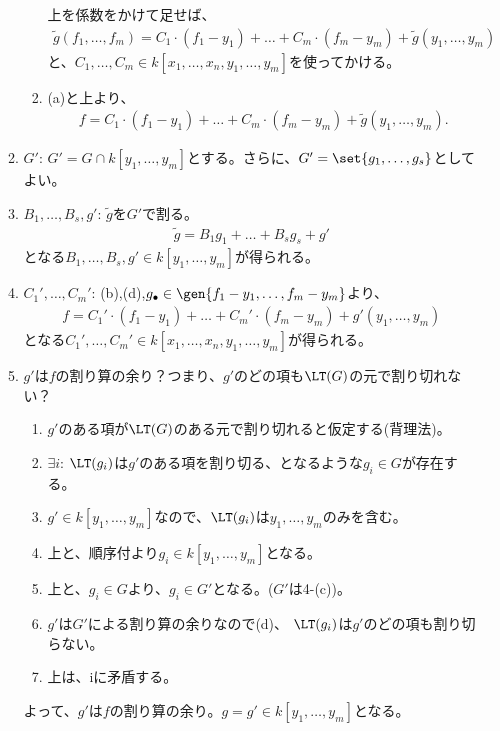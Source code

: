 \begin{myproof}
\begin{enumerate}
\begin{enumerate}
\begin{enumerate}
        上を係数をかけて足せば、
        \begin{align}
          \tilde g(f_1,\dots,f_m)
          =
          C_1 \cdot (f_1-y_1)  + \dots + C_m \cdot (f_m-y_m) + \tilde g(y_1,\dots,y_m)
        \end{align}
        と、$C_1,\dots,C_m \in k[x_1,\dots,x_n,y_1,\dots,y_m]$を使ってかける。
        \item
          (a)と上より、
          \begin{align}
            f
            =
            C_1 \cdot (f_1-y_1)  + \dots + C_m \cdot (f_m-y_m) + \tilde g(y_1,\dots,y_m).
          \end{align}
      \end{enumerate}
      \item
      $G'$: $G'= G\cap k[y_1,\dots,y_m]$とする。さらに、$G'=\set{g_1,\dots,g_s}$としてよい。
      \item
      $B_1,\dots,B_s,g'$:
      $\tilde g$を$G'$で割る。
      \begin{align}
        \tilde g= B_1 g_1 + \dots + B_s g_s + g'
      \end{align}
      となる$B_1,\dots,B_s , g' \in k[y_1,\dots,y_m]$が得られる。
      \item $C_1',\dots,C_m'$:
      (b),(d),$g_\bullet \in \gen{f_1-y_1,\dots,f_m-y_m}$より、
      \begin{align}
        f = C_1' \cdot (f_1-y_1) + \dots + C_m'\cdot (f_m-y_m) + g'(y_1,\dots,y_m)
      \end{align}
      となる$C_1',\dots,C_m' \in k[x_1,\dots,x_n,y_1,\dots,y_m]$が得られる。
      \item
      $g'$は$f$の割り算の余り？つまり、$g'$のどの項も$\LT(G)$の元で割り切れない？
      \begin{enumerate}
        \item $g'$のある項が$\LT(G)$のある元で割り切れると仮定する(背理法)。
        \item $\exists i$: $\LT(g_i)$は$g'$のある項を割り切る、となるような$g_i \in G$が存在する。
        \item
        $g' \in k[y_1,\dots,y_m]$なので、$\LT(g_i)$は$y_1,\dots,y_m$のみを含む。
        \item
        上と、順序付より$g_i \in k[y_1,\dots,y_m]$となる。
        \item
        上と、$g_i \in G$より、$g_i \in G'$となる。($G'$は4-(c))。
        \item
        $g'$は$G'$による割り算の余りなので(d)、
        $\LT(g_i)$は$g'$のどの項も割り切らない。
        \item
        上は、iに矛盾する。
      \end{enumerate}
      よって、$g'$は$f$の割り算の余り。$g=g'\in k[y_1,\dots,y_m]$となる。
    \end{enumerate}
  \end{enumerate}


\end{myproof}
